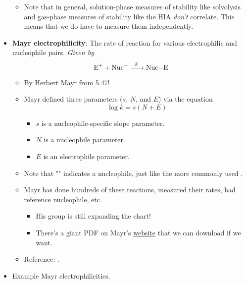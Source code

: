 \documentclass[../notes.tex]{subfiles}
\begin{document}
\begin{itemize}
\begin{itemize}
        \item Note that in general, solution-phase measures of stability like solvolysis and gas-phase measures of stability like the HIA \emph{don't} correlate. This means that we do have to measure them independently.
    \end{itemize}
    \item \textbf{Mayr electrophilicity}: The rate of reaction for various electrophilic and nucleophile pairs. \emph{Given by}
    \begin{equation*}
        \ce{E+ + Nuc- ->[$k$] Nuc-E}
    \end{equation*}
    \begin{itemize}
        \item By Herbert Mayr from 5.47!
        \item Mayr defined three parameters ($s$, $N$, and $E$) via the equation
        \begin{equation*}
            \log k = s(N+E)
        \end{equation*}
        \begin{itemize}
            \item $s$ is a nucleophile-specific slope parameter.
            \item $N$ is a nucleophile parameter.
            \item $E$ is an electrophile parameter.
        \end{itemize}
        \item Note that "" indicates a nucleophile, just like the more commonly used .
        \item Mayr has done hundreds of these reactions, measured their rates, had reference nucleophile, etc.
        \begin{itemize}
            \item His group is still expanding the chart!
            \item There's a giant PDF on Mayr's \href{https://www.cup.uni-muenchen.de/oc/mayr/DBintro.html}{website} that we can download if we want.
        \end{itemize}
        \item Reference: \textcite{bib:Mayr}.
    \end{itemize}
    \pagebreak
    \item Example Mayr electrophilicities.
    \begin{figure}[h!]
        \centering
        \footnotesize

\end{figure}
\end{itemize}
\end{document}
